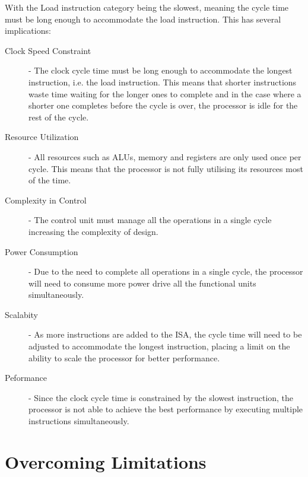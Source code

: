 \documentclass[12pt letter]{report}
\begin{document}
With the Load instruction category being the slowest, meaning the cycle time must be long enough to accommodate the load instruction. This has several implications:
\begin{description}
  \item[Clock Speed Constraint] - The clock cycle time must be long enough to accommodate the longest instruction, i.e. the load instruction. This means that
        shorter instructions waste time waiting for the longer ones to complete and in the case where a shorter one completes before the cycle is over, the processor
        is idle for the rest of the cycle.
  \item[Resource Utilization] - All resources such as ALUs, memory and registers are only used once per cycle. This means that the processor is not
        fully utilising its resources most of the time.
  \item[Complexity in Control] - The control unit must manage all the operations in a single cycle increasing the complexity of design.
  \item[Power Consumption] - Due to the need to complete all operations in a single cycle, the processor will need to consume more power drive all the
        functional units simultaneously.
  \item[Scalabity] - As more instructions are added to the ISA, the cycle time will need to be adjusted to accommodate the longest instruction, placing
        a limit on the ability to scale the processor for better performance.
  \item[Peformance] - Since the clock cycle time is constrained by the slowest instruction, the processor is not able to achieve the best performance
        by executing multiple instructions simultaneously.
\end{description}

\section{Overcoming Limitations}
\end{document}
